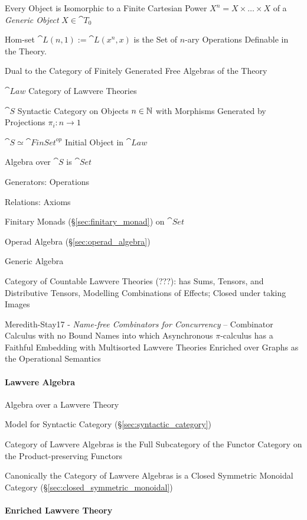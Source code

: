 Every Object is Isomorphic to a Finite Cartesian Power $X^n = X \times
\ldots \times X$ of a \emph{Generic Object} $X \in \cat{T}_0$

Hom-set $\cat{L}(n,1) := \cat{L}(x^n,x)$ is the Set of $n$-ary
Operations Definable in the Theory.

Dual to the Category of Finitely Generated Free Algebras of the Theory

$\cat{Law}$ Category of Lawvere Theories

$\cat{S}$ Syntactic Category on Objects $n \in \mathbb{N}$ with Morphisms
Generated by Projections $\pi_i : n \rightarrow 1$

$\cat{S} \simeq \cat{FinSet}^{op}$ Initial Object in $\cat{Law}$

Algebra over $\cat{S}$ is $\cat{Set}$

Generators: Operations

Relations: Axioms

Finitary Monads (\S\ref{sec:finitary_monad}) on $\cat{Set}$

Operad Algebra (\S\ref{sec:operad_algebra})

Generic Algebra

Category of Countable Lawvere Theories (???): has Sums, Tensors, and
Distributive Tensors, Modelling Combinations of Effects; Closed under
taking Images \cite{hyland-power06}

Meredith-Stay17 - \emph{Name-free Combinators for Concurrency} --
Combinator Calculus with no Bound Names into which Asynchronous
$\pi$-calculus has a Faithful Embedding with Multisorted Lawvere
Theories Enriched over Graphs as the Operational Semantics



\paragraph{Lawvere Algebra}\label{sec:lawvere_algebra}\hfill

Algebra over a Lawvere Theory

Model for Syntactic Category (\S\ref{sec:syntactic_category})

Category of Lawvere Algebras is the Full Subcategory of the Functor
Category on the Product-preserving Functors %

Canonically the Category of Lawvere Algebras is a Closed Symmetric
Monoidal Category (\S\ref{sec:closed_symmetric_monoidal})



\paragraph{Enriched Lawvere Theory}\label{sec:enriched_lawvere}\hfill
\cite{hyland-power06}


